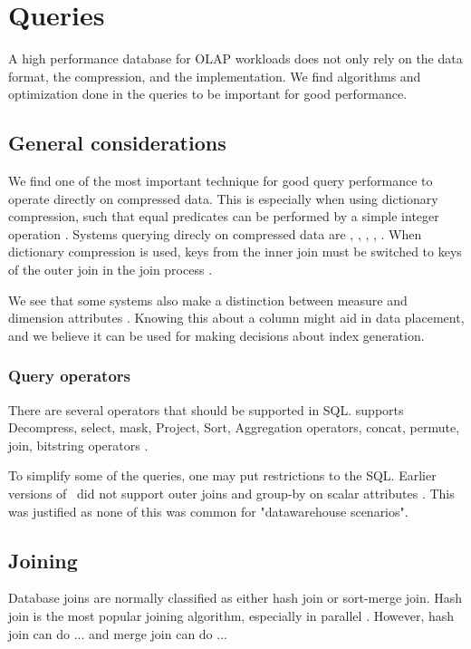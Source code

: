 \chapter{Queries}
\label{chap:Queries}

A high performance database for OLAP workloads does not only rely on the data format, the compression, and the implementation. We find algorithms and optimization done in the queries to be important for good performance.
\newpage

\section{General considerations}
\label{sec:General considerations}
We find one of the most important technique for good query performance to operate directly on compressed data. This is especially when using dictionary compression, such that equal predicates can be performed by a simple integer operation \cite{Abadi2008-dd}. Systems querying direcly on compressed data are \cstore, \ibm, \mssql, \blink, \saph. When dictionary compression is used, keys from the inner join must be switched to keys of the outer join in the join process \cite{Raman2013-em}.

We see that some systems also make a distinction between measure and dimension attributes \cite{Kamkolkar2015-iq, Johnson2008-cp}. Knowing this about a column might aid in data placement, and we believe it can be used for making decisions about index generation.

\subsection{Query operators}
\label{sub:Query operators}
There are several operators that should be supported in SQL. \cstore supports Decompress, select, mask, Project, Sort, Aggregation operators, concat, permute, join, bitstring operators \cite{Stonebraker2005-qz}.

To simplify some of the queries, one may put restrictions to the SQL. Earlier versions of \mssql~did not support outer joins and group-by on scalar attributes \cite{Larson2013-mc}. This was justified as none of this was common for "datawarehouse scenarios".~


\section{Joining}
\label{sec:Joining}
Database joins are normally classified as either hash join or sort-merge join. Hash join is the most popular joining algorithm, especially in parallel \cite{Boncz2002-yj}. However, hash join can do ... and merge join can do ... \cite{DeWitt1992-ki}

